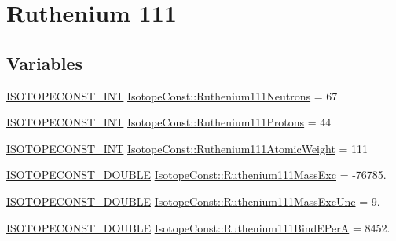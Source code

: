 \hypertarget{group___isotope_const-_ruthenium-_ru111}{}\section{Ruthenium 111}
\label{group___isotope_const-_ruthenium-_ru111}
\subsection*{Variables}
\begin{DoxyCompactItemize}
\item 
\mbox{\hyperlink{group___isotope_const-_macros_ga5f18360b3e99483a35c32d789e62621c}{I\+S\+O\+T\+O\+P\+E\+C\+O\+N\+S\+T\+\_\+\+I\+NT}} \mbox{\hyperlink{group___isotope_const-_ruthenium-_ru111_gaa038c082008cf328249685062296a719}{Isotope\+Const\+::\+Ruthenium111\+Neutrons}} = 67
\item 
\mbox{\hyperlink{group___isotope_const-_macros_ga5f18360b3e99483a35c32d789e62621c}{I\+S\+O\+T\+O\+P\+E\+C\+O\+N\+S\+T\+\_\+\+I\+NT}} \mbox{\hyperlink{group___isotope_const-_ruthenium-_ru111_ga33e32808e4d2ce4edb1b507b33f65549}{Isotope\+Const\+::\+Ruthenium111\+Protons}} = 44
\item 
\mbox{\hyperlink{group___isotope_const-_macros_ga5f18360b3e99483a35c32d789e62621c}{I\+S\+O\+T\+O\+P\+E\+C\+O\+N\+S\+T\+\_\+\+I\+NT}} \mbox{\hyperlink{group___isotope_const-_ruthenium-_ru111_gaa90fe84c2cbc0131b5515c0aa9e7cbe0}{Isotope\+Const\+::\+Ruthenium111\+Atomic\+Weight}} = 111
\item 
\mbox{\hyperlink{group___isotope_const-_macros_ga8f45a7272ce02c0b4c65c44636ed719a}{I\+S\+O\+T\+O\+P\+E\+C\+O\+N\+S\+T\+\_\+\+D\+O\+U\+B\+LE}} \mbox{\hyperlink{group___isotope_const-_ruthenium-_ru111_gabf2662618e2c279df2a28a3e21eef34c}{Isotope\+Const\+::\+Ruthenium111\+Mass\+Exc}} = -\/76785.
\item 
\mbox{\hyperlink{group___isotope_const-_macros_ga8f45a7272ce02c0b4c65c44636ed719a}{I\+S\+O\+T\+O\+P\+E\+C\+O\+N\+S\+T\+\_\+\+D\+O\+U\+B\+LE}} \mbox{\hyperlink{group___isotope_const-_ruthenium-_ru111_gacd5e68f87ff8144d14f54958a94926cc}{Isotope\+Const\+::\+Ruthenium111\+Mass\+Exc\+Unc}} = 9.
\item 
\mbox{\hyperlink{group___isotope_const-_macros_ga8f45a7272ce02c0b4c65c44636ed719a}{I\+S\+O\+T\+O\+P\+E\+C\+O\+N\+S\+T\+\_\+\+D\+O\+U\+B\+LE}} \mbox{\hyperlink{group___isotope_const-_ruthenium-_ru111_gab4525b0b8b3e9461672bb9f89eefd3e0}{Isotope\+Const\+::\+Ruthenium111\+Bind\+E\+PerA}} = 8452.
\item 

\end{DoxyCompactItemize}
